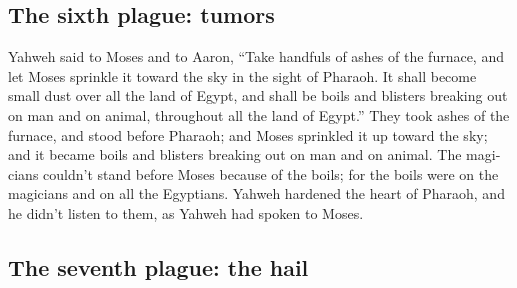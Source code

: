 \begin{paracol}{2}
\begin{otherlanguage}{english}
\hypertarget{the-sixth-plague-tumors}{%
\subsection{The sixth plague: tumors}\label{the-sixth-plague-tumors}}

 Yahweh said to Moses and to Aaron, ``Take handfuls of
ashes of the furnace, and let Moses sprinkle it toward the sky in the
sight of Pharaoh.  It shall become small dust over all the
land of Egypt, and shall be boils and blisters breaking out on man and
on animal, throughout all the land of Egypt.''  They took
ashes of the furnace, and stood before Pharaoh; and Moses sprinkled it
up toward the sky; and it became boils and blisters breaking out on man
and on animal.  The magicians couldn't stand before Moses
because of the boils; for the boils were on the magicians and on all the
Egyptians.  Yahweh hardened the heart of Pharaoh, and he
didn't listen to them, as Yahweh had spoken to Moses.

\hypertarget{the-seventh-plague-the-hail}{%
\subsection{The seventh plague: the
hail}\label{the-seventh-plague-the-hail}}


\end{otherlanguage}
\end{paracol}
